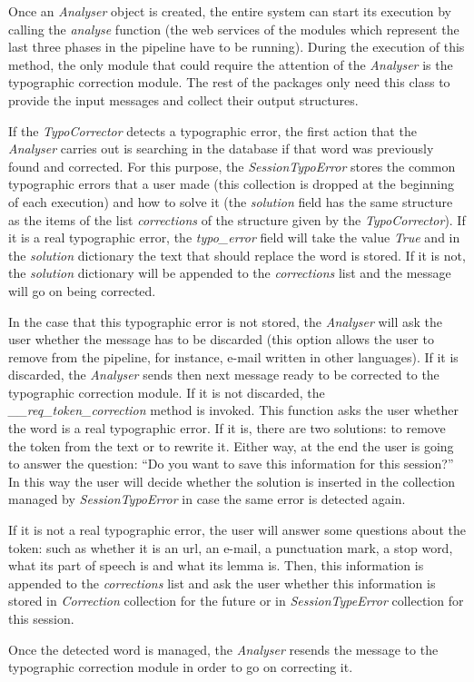 Once an \textit{Analyser} object is created, the entire system can start its execution by calling the \textit{analyse} function (the web services of the modules which represent the last three phases in the pipeline have to be running). During the execution of this method, the only module that could require the attention of the \textit{Analyser} is the typographic correction module. The rest of the packages only need this class to provide the input messages and collect their output structures.

If the \textit{TypoCorrector} detects a typographic error, the first action that the \textit{Analyser} carries out is searching in the database if that word was previously found and corrected. For this purpose, the \textit{SessionTypoError} stores the common typographic errors that a user made (this collection is dropped at the beginning of each execution) and how to solve it (the \textit{solution} field has the same structure as the items of the list \textit{corrections} of the structure given by the \textit{TypoCorrector}). If it is a real typographic error, the \textit{typo\_error} field will take the value \textit{True} and in the \textit{solution} dictionary the text that should replace the word is stored. If it is not, the \textit{solution} dictionary will be appended to the \textit{corrections} list and the message will go on being corrected.

In the case that this typographic error is not stored, the \textit{Analyser} will ask the user whether the message has to be discarded (this option allows the user to remove from the pipeline, for instance, e-mail written in other languages). If it is discarded, the \textit{Analyser} sends then next message ready to be corrected to the typographic correction module. If it is not discarded, the \textit{\_\_req\_token\_correction} method is invoked. This function asks the user whether the word is a real typographic error. If it is, there are two solutions: to remove the token from the text or to rewrite it. Either way, at the end the user is going to answer the question: ``Do you want to save this information for this session?'' In this way the user will decide whether the solution is inserted in the collection managed by \textit{SessionTypoError} in case the same error is detected again.

If it is not a real typographic error, the user will answer some questions about the token: such as whether it is an url, an e-mail, a punctuation mark, a stop word, what its part of speech is and what its lemma is. Then, this information is appended to the \textit{corrections} list and ask the user whether this information is stored in \textit{Correction} collection for the future or in \textit{SessionTypeError} collection for this session.

Once the detected word is managed, the \textit{Analyser} resends the message to the typographic correction module in order to go on correcting it.

